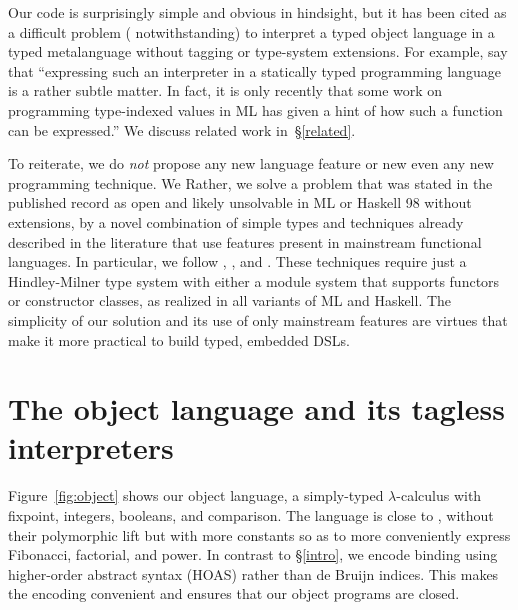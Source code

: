 Our code is surprisingly simple and obvious in hindsight, but
it has been cited as a difficult problem (\cite{sumii-hybrid}
notwithstanding) to interpret a typed object language in a typed metalanguage
without tagging or type\hyp system extensions.  For example, \citet{taha-tag}
say that ``expressing such an interpreter in a statically typed
programming language is a rather subtle matter. In fact, it is only
recently that some work on programming type-indexed values in ML
\citep{yang-encoding} has given a hint of how such a function can be
expressed.''  We discuss related work in~\S\ref{related}.

To reiterate, we do \emph{not} propose any new language
feature or \ifshort new \else even any new programming \fi technique.
\ifshort
We
\else
Rather, we
\fi
solve a problem that was stated in the published record as open and
likely unsolvable in ML or Haskell 98 without extensions, by a novel
combination of simple types and techniques already described in the
literature that use features present in mainstream functional languages.
In particular, we follow \citet{yang-encoding}, \citet{asai-binding-time}, and
\citet{sumii-hybrid}.  These techniques require just
a Hindley-Milner type system with either a module system that supports
functors or constructor classes, as realized in all variants of ML and
Haskell.
The simplicity of our solution and its
use of only mainstream features \ifshort\else are virtues that \fi make it more practical to build typed,
embedded DSLs.
\begin{comment}
We may claim some contribution about type-preserving CPS. Check
related work section in \citep{Guillemette-Monier-PLPV}, especially
check the work of Shao on type-preserving CPS in Flint. The PLPV paper
in related work shows other tasks, including closure conversion, which
we may tackle in our approach. We may be able to write a
type-preserving, assured compiler, whose properties and assured by HM.
\end{comment}


\section{The object language and its tagless interpreters}\label{language}

Figure~\ref{fig:object} shows our object language, a simply-typed
$\lambda$-calculus with fixpoint, integers, booleans, and comparison.
The language is close to , without their polymorphic
lift but with more constants so as to more conveniently express Fibonacci,
factorial, and power.
In contrast to \S\ref{intro}, we encode binding using higher-order
abstract syntax (HOAS) \citep{miller-manipulating,pfenning-higher-order}
rather than de Bruijn indices. This makes the encoding convenient and
ensures that our object programs are closed.

